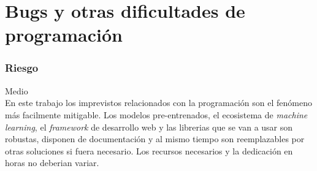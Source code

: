 \section{Bugs y otras dificultades de programación}
\subsubsection{Riesgo} Medio\\
En este trabajo los imprevistos relacionados con la programación son el fenómeno
más facilmente mitigable. Los modelos pre-entrenados, el ecosistema de \textit{machine learning},
el \textit{framework} de desarrollo web y las librerias que se van a usar son robustas,
disponen de documentación y al mismo tiempo son reemplazables por otras soluciones si fuera necesario.
Los recursos necesarios y la dedicación en horas no deberian variar.